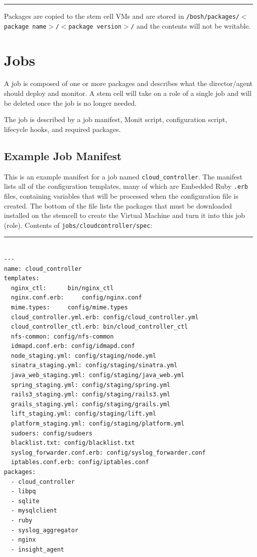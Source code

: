 \begin{center}\rule{3in}{0.4pt}\end{center}


Packages are copied to the stem cell VMs and are stored in \texttt{\slash bosh\slash packages\slash $<$package name$>$\slash $<$package version$>$\slash } and the contents will not be writable.

\chapter{Jobs}
\label{jobs}

A job is composed of one or more packages and describes what the director\slash agent should deploy and monitor. A stem cell will take on a role of a single job and will be deleted once the job is no longer needed.

The job is described by a job manifest, Monit script, configuration script, lifecycle hooks, and required packages.

\section{Example Job Manifest}
\label{examplejobmanifest}

This is an example manifest for a job named \texttt{cloud\_controller}. The manifest lists all of the configuration templates, many of which are Embedded Ruby \texttt{.erb} files, containing variables that will be processed when the configuration file is created. The bottom of the file lists the packages that must be downloaded installed on the stemcell to create the Virtual Machine and turn it into this job (role). Contents of
\texttt{jobs\slash cloudcontroller\slash spec}:

\begin{center}\rule{3in}{0.4pt}\end{center}


\begin{adjustwidth}{2.5em}{2.5em}
\begin{verbatim}

---
name: cloud_controller
templates:
  nginx_ctl:      bin/nginx_ctl
  nginx.conf.erb:     config/nginx.conf
  mime.types:     config/mime.types
  cloud_controller.yml.erb: config/cloud_controller.yml
  cloud_controller_ctl.erb: bin/cloud_controller_ctl
  nfs-common: config/nfs-common
  idmapd.conf.erb: config/idmapd.conf
  node_staging.yml: config/staging/node.yml
  sinatra_staging.yml: config/staging/sinatra.yml
  java_web_staging.yml: config/staging/java_web.yml
  spring_staging.yml: config/staging/spring.yml
  rails3_staging.yml: config/staging/rails3.yml
  grails_staging.yml: config/staging/grails.yml
  lift_staging.yml: config/staging/lift.yml
  platform_staging.yml: config/staging/platform.yml
  sudoers: config/sudoers
  blacklist.txt: config/blacklist.txt
  syslog_forwarder.conf.erb: config/syslog_forwarder.conf
  iptables.conf.erb: config/iptables.conf
packages:
  - cloud_controller
  - libpq
  - sqlite
  - mysqlclient
  - ruby
  - syslog_aggregator
  - nginx
  - insight_agent

\end{verbatim}
\end{adjustwidth}

